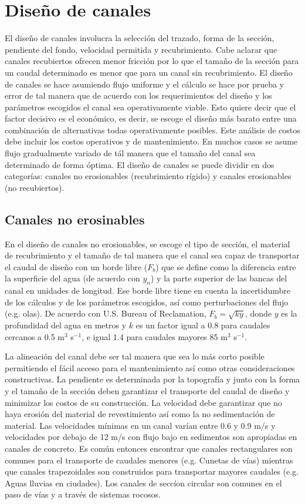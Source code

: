 \documentclass[11pt, oneside]{article}
\begin{document}
\section{Diseño de canales} %
El diseño de canales involucra la selecci\'on del trazado, forma de la secci\'on, pendiente del fondo, velocidad permitida y recubrimiento. Cabe aclarar que canales recubiertos ofrecen menor fricci\'on por lo que el tamaño de la secci\'on para un caudal determinado es menor que para un canal sin recubrimiento. El diseño de canales se hace asumiendo flujo uniforme y el c\'alculo se hace por prueba y error de tal manera que de acuerdo con los requerimientos del diseño y los parámetros escogidos el canal sea operativamente viable. Esto quiere decir que el factor decisivo es el económico, es decir, se escoge el diseño m\'as barato entre una combinación de alternativas todas operativamente posibles. Este análisis de costos debe incluir los costos operativos y de mantenimiento. En muchos casos se asume flujo gradualmente variado de t\'al manera que el tamaño del canal sea determinado de forma \'optima. El diseño de canales se puede dividir en dos categorías: canales no erosionables (recubrimiento rígido) y canales erosionables (no recubiertos).

\subsection{Canales no erosinables}
En el diseño de canales no erosionables, se escoge el tipo de secci\'on, el material de recubrimiento y el tamaño de tal manera que el canal sea capaz de transportar el caudal de diseño con un borde libre ($F_b$) que se define como la diferencia entre la superficie del agua (de acuerdo con $y_n$) y la parte superior de las bancas del canal en unidades de longitud. Ese borde libre tiene en cuenta la incertidumbre de los c\'alculos y de los parámetros escogidos, así como perturbaciones del flujo (e.g. olas). De acuerdo con U.S. Bureau of Reclamation, $F_b = \sqrt{k y}$, donde $y$ es la profundidad del agua en metros y $k$ es un factor igual a 0.8 para caudales cercanos a 0.5 m$^3$ s$^{-1}$, e igual 1.4 para caudales mayores 85  m$^3$ s$^{-1}$. 

La alineaci\'on del canal debe ser tal manera que sea lo m\'as corto posible permitiendo el fácil acceso para el mantenimiento así como otras consideraciones constructivas. La pendiente es determinada por la topografía y junto con la forma y el tamaño de la secci\'on deben garantizar el transporte del caudal de diseño y minimizar los costos de su construcci\'on. La velocidad debe garantizar que no haya erosión del material de revestimiento así como la no sedimentación de material. Las velocidades mínimas en un canal varían entre 0.6 y 0.9 m/s y velocidades por debajo de 12 m/s con flujo bajo en sedimentos son apropiadas en canales de concreto. Es común entonces encontrar que canales rectangulares son comunes para el transporte de caudales menores (e.g. Cunetas de vías) mientras que canales trapezoidales son construidos para transportar mayores caudales (e.g. Aguas lluvias en ciudades). Los canales de secc\'ion circular son comunes en el paso de vías y a través de sistemas rocosos. 
\end{document}
